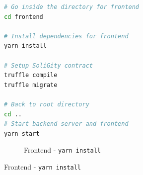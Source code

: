\documentclass[12pt]{article}
\renewcommand{\_}{\kern-1.5pt\textunderscore\kern-1.5pt}
\begin{document}
\begin{figure}[H]
	\begin{minipage}[t]{0.4\linewidth}
		\begin{lstlisting}[language=bash]
# Go inside the directory for frontend
cd frontend

# Install dependencies for frontend
yarn install

# Setup SoliGity contract
truffle compile
truffle migrate

# Back to root directory
cd ..
# Start backend server and frontend
yarn start
				\end{lstlisting}
	\end{minipage}\hfill
	\begin{minipage}[t]{0.5\linewidth}
					\begin{subfigure}[b]{\textwidth}
				\captionsetup{justification   = raggedright,
              singlelinecheck = false}
			\centering
						\caption*{Frontend - \texttt{yarn install}}


\end{subfigure}
\end{minipage}
\end{figure}
\end{document}
